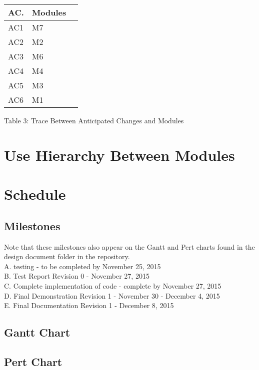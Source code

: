\documentclass[12pt, letterpaper]{article}
\begin{document}
				\begin{center}
					\begin{tabular}{ p{6cm} p{4cm} p{4cm}  }
						\hline
						AC. & Modules &\\ 
						\hline
						AC1  & M7 & \\ 
						AC2  & M2 & \\
						AC3  & M6 & \\
						AC4  & M4 & \\
						AC5  & M3 & \\
						AC6  & M1 & \\
						\hline
						
					\end{tabular}				
					\footnotesize Table 3: Trace Between Anticipated Changes and Modules
				\end{center}
	
	\section{Use Hierarchy Between Modules}
	
	
	
	\section{Schedule}
	\subsection{Milestones} 
	Note that these milestones also appear on the Gantt and Pert charts found in the design document folder in the repository.\\
	
	\noindent A. \indent \indent testing - to be completed by November 25, 2015 \\
	\noindent B. \indent \indent Test Report Revision 0 - November 27, 2015 \\
	\noindent C. \indent \indent Complete implementation of code - complete by November 27, 2015 \\
	\noindent D. \indent \indent Final Demonstration Revision 1 - November 30 - December 4, 2015 \\
	\noindent E. \indent \indent Final Documentation Revision 1 - December 8, 2015 \\
	
	\subsection{Gantt Chart}
	
	
	\subsection{Pert Chart}
	
	
	
\end{document}
